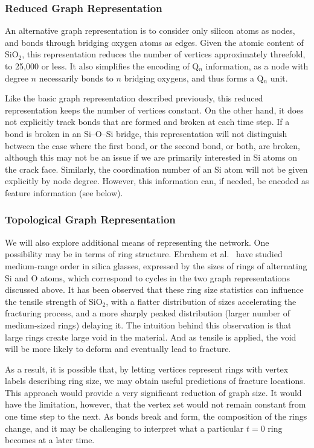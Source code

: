 \subsubsection{Reduced Graph Representation} 

An alternative graph representation is to consider only silicon atoms as nodes, and bonds through bridging oxygen atoms as edges.  Given the atomic content of SiO$_2$, this representation reduces the number of vertices approximately threefold, to 25,000 or less.  It also simplifies the encoding of Q$_n$ information, as a node with degree $n$ necessarily bonds to $n$ bridging oxygens, and thus forms a Q$_n$ unit.

Like the basic graph representation described previously, this reduced representation keeps the number of vertices constant.  On the other hand, it does not explicitly track bonds that are formed and broken at each time step. If a bond is broken in an Si--O--Si bridge, this representation will not distinguish between the case where the first bond, or the second bond, or both, are broken, although this may not be an issue if we are primarily interested in Si atoms on the crack face.  Similarly, the coordination number of an Si atom will not be given explicitly by node degree.  However, this information can, if needed, be encoded as feature information (see below).


\subsubsection{Topological Graph Representation}


We will also explore additional means of representing the network.  One possibility may be in terms of ring structure.  Ebrahem et al.~\cite{ebrahem2018influence} have studied medium-range order in silica glasses, expressed by the sizes of rings of alternating Si and O atoms, which correspond to cycles in the two graph representations discussed above. It has been observed that these ring size statistics can influence the tensile strength of SiO$_2$, with a flatter distribution of sizes accelerating the fracturing process, and a more sharply peaked distribution (larger number of medium-sized rings) delaying it. The intuition behind this observation is that large rings create large void in the material. And as tensile is applied, the void will be more likely to deform and eventually lead to fracture.

As a result, it is possible that, by letting vertices represent rings with vertex labels describing ring size, we may obtain useful predictions of fracture locations. This approach would provide a very significant reduction of graph size.  It would have the limitation, however, that the vertex set would not remain constant from one time step to the next.  As bonds break and form, the composition of the rings change, and it may be challenging to interpret what a particular $t=0$ ring becomes at a later time.


